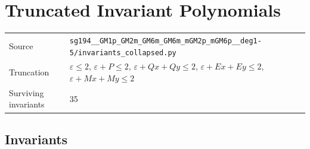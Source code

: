 \documentclass{article}
\begin{document}
\section*{Truncated Invariant Polynomials}

\begin{tabular}{ll}
\toprule
Source & \texttt{sg194__GM1p_GM2m_GM6m_GM6m_mGM2p_mGM6p__deg1-5/invariants_collapsed.py} \\
Truncation & $ε \leq 2$, $ε+P \leq 2$, $ε+Qx+Qy \leq 2$, $ε+Ex+Ey \leq 2$, $ε+Mx+My \leq 2$ \\
Surviving invariants & 35 \\
\bottomrule
\end{tabular}

\subsection*{Invariants}
\end{document}

